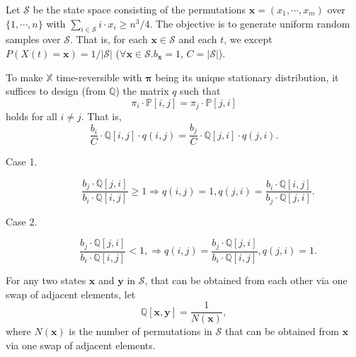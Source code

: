 \begin{example}
Let $ \mathcal{S} $ be the state space consisting of the permutations $ \mathbf{x} = (x_{1}, \cdots, x_{m}) $ over $ \{ 1, \cdots, n \} $ with $ \sum_{i \in \mathcal{S}} i \cdot x_{i} \ge n^{3} / 4 $. The objective is to generate uniform random samples over $ \mathcal{S} $. That is, for each $ \mathbf{x} \in \mathcal{S} $ and each $ t $, we except $ P(X(t) = \mathbf{x}) = 1 / |\mathcal{S}| $ ($ \forall \mathbf{x} \in \mathcal{S}. b_{\mathbf{x}} = 1 $, $ C = |\mathcal{S}| $).

To make $ \mathbb{X} $ time-reversible with $ \boldsymbol\pi $ being its unique stationary distribution, it suffices to design (from $ \mathbb{Q} $) the matrix $ q $ such that
\[ \pi_{i} \cdot \mathbb{P}[i, j] = \pi_{j} \cdot \mathbb{P}[j, i] \]
holds for all $ i \neq j $. That is,
\[ \frac{b_{i}}{C} \cdot \mathbb{Q}[i, j] \cdot q(i, j) = \frac{b_{j}}{C} \cdot \mathbb{Q}[j, i] \cdot q(j, i). \]

\begin{description}
  \item[Case 1.]
    \[ \frac{b_{j} \cdot \mathbb{Q}[j, i]}{b_{i} \cdot \mathbb{Q}[i, j]} \ge 1
      \Rightarrow q(i, j) = 1, q(j, i) = \frac{b_{i} \cdot \mathbb{Q}[i, j]}{b_{j} \cdot \mathbb{Q}[j, i]}. \]
  \item[Case 2.]
    \[ \frac{b_{j} \cdot \mathbb{Q}[j, i]}{b_{i} \cdot \mathbb{Q}[i, j]} < 1,
      \Rightarrow q(i, j) = \frac{b_{j} \cdot \mathbb{Q}[j, i]}{b_{i} \cdot \mathbb{Q}[i, j]}, q(j, i) = 1. \]
\end{description}

For any two states $ \mathbf{x} $ and $ \mathbf{y} $ in $ \mathcal{S} $, that can be obtained from each other via one swap of adjacent elements, let
\[ \mathbb{Q}[\mathbf{x}, \mathbf{y}] = \frac{1}{N(\mathbf{x})}, \]
where $ N(\mathbf{x}) $ is the number of permutations in $ \mathcal{S} $ that can be obtained from $ \mathbf{x} $ via one swap of adjacent elements.
\end{example}
